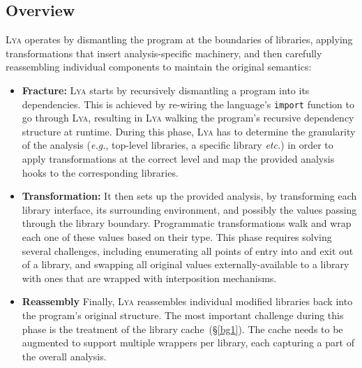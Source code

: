 \documentclass[letterpaper,twocolumn,10pt]{article}
\def\eg{{\em e.g.}, }
\def\etc{{\em etc.}\xspace}
\newcommand{\ttt}[1]{\texttt{#1}}
\newcommand{\sx}[1]{(\S\ref{#1})}
\newcommand{\sys}{{\scshape Lya}\xspace}
\begin{document}
\subsection{Overview}
\label{overview}

\sys operates by
  dismantling the program at the boundaries of libraries,
  applying transformations that insert analysis-specific machinery, and then carefully 
  reassembling individual components to maintain the original semantics:

\begin{itemize}
  
  \item \textbf{Fracture:}
\sys starts by recursively dismantling a program into its dependencies. %
This is achieved by re-wiring the language's \ttt{import} function to go through \sys, resulting in \sys walking the program's recursive dependency structure at runtime.
During this phase, \sys has to determine the granularity of the analysis (\eg top-level libraries, a specific library \etc) in order to apply transformations at the correct level and map the provided analysis hooks to the corresponding libraries.

  \item \textbf{Transformation:}
It then sets up the provided analysis, by transforming each library interface, its surrounding environment, and possibly the values passing through the library boundary.
Programmatic transformations walk and wrap each one of these values based on their type.
This phase requires solving several challenges, including enumerating all points of entry into and exit out of a library, 
and swapping all original values externally-available to a library with ones that are wrapped with interposition mechanisms.

  \item \textbf{Reassembly}
Finally, \sys reassembles individual modified libraries back into the program's original structure.
The most important challenge during this phase is the treatment of the library cache~\sx{bg1}.
The cache needs to be augmented to support multiple wrappers per library, each capturing a part of the overall analysis.

\end{itemize}
\end{document}
